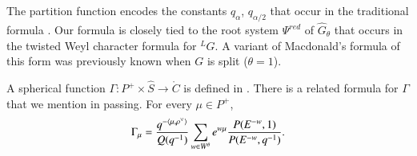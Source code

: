 The partition function encodes the constants $q_\alpha$,
$q_{\alpha/2}$ that occur in the traditional formula
\cite{macdonaldspherical}.  Our formula is closely tied to the root
system $\Psi^{red}$ of $\hat G_\theta$ that occurs in the twisted Weyl
character formula for ${}^LG$.  A variant of Macdonald's formula of
this form was previously known when $G$ is split ($\theta=1$).

A spherical function $\Gamma:P^+\times\hat S\to\ring{C}$ is defined in
\cite{macdonaldspherical}.  There is a related formula for $\Gamma$
that we mention in passing.  For every $\mu\in P^+$,
\begin{equation} 
\Gamma_\mu = 
\frac{q^{-\langle{\mu,\rho^\vee}\rangle}}{ Q(q^{-1})} 
\sum_{w\in W^\theta} e^{w\mu} \frac{P(E^{-w},1)}{P(E^{-w},q^{-1})}.
\end{equation}

